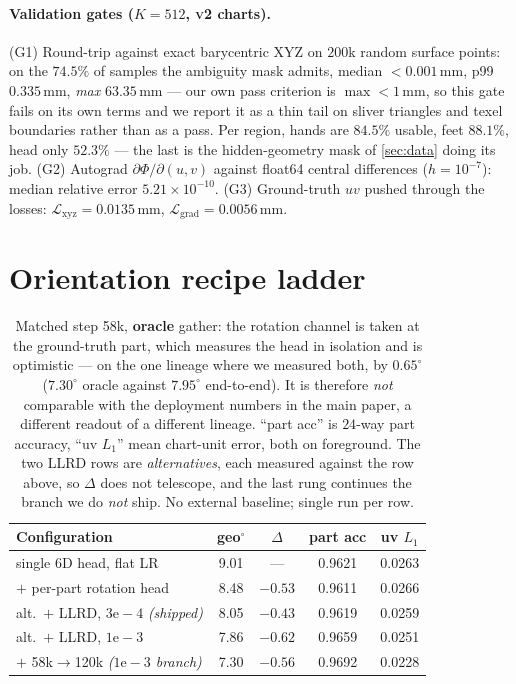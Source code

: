 \paragraph{Validation gates ($K{=}512$, \textsc{v2} charts).}
(G1) Round-trip against exact barycentric XYZ on $200$k random surface points: on the $74.5\%$ of
samples the ambiguity mask admits, median $<0.001$\,mm, p99 $0.335$\,mm, \emph{max} $63.35$\,mm ---
our own pass criterion is $\max<1$\,mm, so this gate fails on its own terms and we report it as a
thin tail on sliver triangles and texel boundaries rather than as a pass. Per region, hands are
$84.5\%$ usable, feet $88.1\%$, head only $52.3\%$ --- the last is the hidden-geometry mask of
\cref{sec:data} doing its job. (G2) Autograd $\partial\Phi/\partial(u,v)$ against float64 central
differences ($h{=}10^{-7}$): median relative error $5.21\times10^{-10}$. (G3) Ground-truth $uv$
pushed through the losses: $\mathcal{L}_{\mathrm{xyz}}=0.0135$\,mm,
$\mathcal{L}_{\mathrm{grad}}=0.0056$\,mm.

\section{Orientation recipe ladder}
\label{sup:ladder}

\begin{table}[h]
\setlength{\tabcolsep}{4pt}
\centering\footnotesize
\begin{tabular}{@{}lcccc@{}}
\toprule
Configuration & geo$^\circ$ & $\Delta$ & part acc & uv $L_1$ \\
\midrule
single $6$D head, flat LR      & 9.01 & --- & 0.9621 & 0.0263 \\
$+$ per-part rotation head     & 8.48 & $-0.53$ & 0.9611 & 0.0266 \\
\quad alt.\ $+$ LLRD, $3\mathrm{e}{-}4$ \emph{(shipped)} & 8.05 & $-0.43$ & 0.9619 & 0.0259 \\
\quad alt.\ $+$ LLRD, $1\mathrm{e}{-}3$ & 7.86 & $-0.62$ & 0.9659 & 0.0251 \\
$+$ 58k$\rightarrow$120k \emph{($1\mathrm{e}{-}3$ branch)} & 7.30 & $-0.56$ & 0.9692 & 0.0228 \\
\bottomrule
\end{tabular}
\caption{Matched step 58k, \textbf{oracle} gather: the rotation channel is taken at the
ground-truth part, which measures the head in isolation and is optimistic --- on the one lineage
where we measured both, by $0.65^\circ$ ($7.30^\circ$ oracle against $7.95^\circ$ end-to-end). It
is therefore \emph{not} comparable with the deployment numbers in the main paper, a different
readout of a different lineage. ``part acc'' is $24$-way part accuracy, ``uv $L_1$'' mean
chart-unit error, both on foreground. The two LLRD rows are \emph{alternatives}, each measured
against the row above, so $\Delta$ does not telescope, and the last rung continues the branch we do
\emph{not} ship. No external baseline; single run per row.}
\label{tab:orient}
\end{table}

